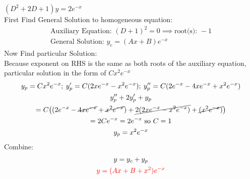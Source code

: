 \item [9.] $(D^2+2D+1)y=2e^{-x}$\\[2mm]
First Find General Solution to homogeneous equation:
\begin{gather*}
    \text{Auxiliary Equation: } (D+1)^2=0 \implies \text{root(s): } -1\\
    \text{General Solution: } y_c=(Ax+B)e^{-x}
\end{gather*}
Now Find particular Solution:\\
Because exponent on RHS is the same as both roots of the auxiliary equation, particular solution in the form of $Cx^2e^{-x}$
\begin{gather*}
    y_p=Cx^2e^{-x};\:y_p'=C(2xe^{-x}-x^2e^{-x});\:y_p''=C(2e^{-x}-4xe^{-x}+x^2e^{-x})\\
    y_p''+2y_p'+y_p\\=C\big(
        (2e^{-x}-\cancel{4xe^{-x}}+\cancel{x^2e^{-x}})
        +\cancel{2(2xe^{-x}-x^2e^{-x})}
        +\cancel{(x^2e^{-x})}
    \big)\\
    =2Ce^{-x} = 2e^{-x} \text{ so } C=1\\
    y_p = x^2e^{-x}
\end{gather*}
Combine:
\begin{gather*}
    y=y_c+y_p\\
    \textcolor{red}{y = (Ax+B+x^2)e^{-x}}
\end{gather*}